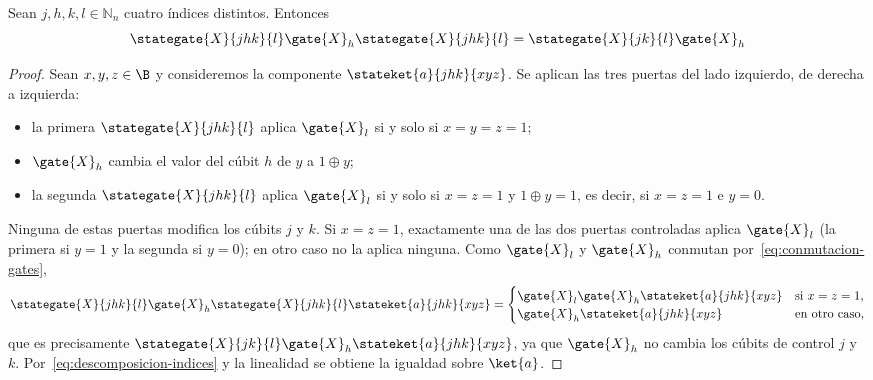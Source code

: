 \begin{proposition}
  Sean $j,h,k,l \in \mathbb{N}_n$ cuatro índices distintos.
  Entonces
  \begin{equation}
    \label{eq:mainresult}
    \stategate{X}{jhk}{l}\gate{X}_h\stategate{X}{jhk}{l} = \stategate{X}{jk}{l}\gate{X}_h
  \end{equation}
\end{proposition}
\begin{proof}
  Sean $x,y,z\in\B$ y consideremos la componente $\stateket{a}{jhk}{xyz}$. Se aplican las tres puertas del lado izquierdo, de derecha a izquierda:
  \begin{itemize}
    \item la primera $\stategate{X}{jhk}{l}$ aplica $\gate{X}_l$ si y solo si $x=y=z=1$;
    \item $\gate{X}_h$ cambia el valor del cúbit $h$ de $y$ a $1\oplus y$;
    \item la segunda $\stategate{X}{jhk}{l}$ aplica $\gate{X}_l$ si y solo si $x=z=1$ y $1\oplus y=1$, es decir, si $x=z=1$ e $y=0$.
  \end{itemize}
  Ninguna de estas puertas modifica los cúbits $j$ y $k$. Si $x=z=1$, exactamente una de las dos puertas controladas aplica $\gate{X}_l$ (la primera si $y=1$ y la segunda si $y=0$); en otro caso no la aplica ninguna. Como $\gate{X}_l$ y $\gate{X}_h$ conmutan por~\eqref{eq:conmutacion-gates},
  \[
    \stategate{X}{jhk}{l}\gate{X}_h\stategate{X}{jhk}{l}\stateket{a}{jhk}{xyz}=
    \begin{cases}
      \gate{X}_l\gate{X}_h\stateket{a}{jhk}{xyz} & \text{si } x=z=1, \\
      \gate{X}_h\stateket{a}{jhk}{xyz}           & \text{en otro caso,}
    \end{cases}
  \]
  que es precisamente $\stategate{X}{jk}{l}\gate{X}_h\stateket{a}{jhk}{xyz}$, ya que $\gate{X}_h$ no cambia los cúbits de control $j$ y $k$. Por~\eqref{eq:descomposicion-indices} y la linealidad se obtiene la igualdad sobre $\ket{a}$.
\end{proof}
